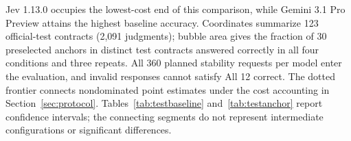 Jev 1.13.0 occupies the lowest-cost end of this comparison, while Gemini 3.1 Pro Preview attains the highest baseline accuracy. Coordinates summarize 123 official-test contracts (2,091 judgments); bubble area gives the fraction of 30 preselected anchors in distinct test contracts answered correctly in all four conditions and three repeats. All 360 planned stability requests per model enter the evaluation, and invalid responses cannot satisfy All 12 correct. The dotted frontier connects nondominated point estimates under the cost accounting in Section~\ref{sec:protocol}. Tables~\ref{tab:testbaseline} and~\ref{tab:testanchor} report confidence intervals; the connecting segments do not represent intermediate configurations or significant differences.
